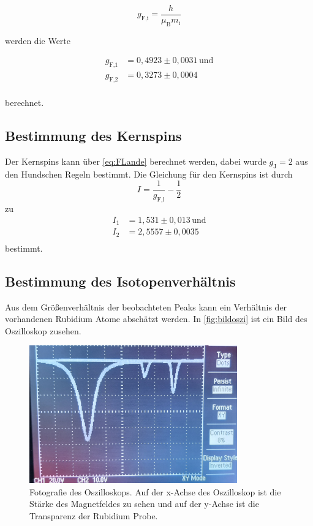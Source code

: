 \begin{equation*}
    g_{\text{F,i}} = \dfrac{h}{\mu_\text{B} m_\text{i}}
\end{equation*}

werden die Werte

\begin{align*}
    g_{\text{F,1}} &= 0,4923 \pm 0,0031 \, \text{und} \\
    g_{\text{F,2}} &= 0,3273 \pm 0,0004           \\
\end{align*}

berechnet.

\subsection{Bestimmung des Kernspins}

Der Kernspins kann über \eqref{eq:FLande} berechnet werden, dabei wurde $g_\text{J} = 2$ aus den Hundschen Regeln bestimmt.
Die Gleichung für den Kernspins ist durch 
\begin{equation*}
    I = \dfrac{1}{g_{\text{F,i}}} - \dfrac{1}{2}
\end{equation*}
zu 
\begin{align*}
    I_1 &= 1,531  \pm 0,013 \, \text{und} \\
    I_2 &= 2,5557 \pm 0,0035           \\
\end{align*}
bestimmt.

\subsection{Bestimmung des Isotopenverhältnis}

Aus dem Größenverhältnis der beobachteten Peaks kann ein Verhältnis der vorhandenen Rubidium Atome abschätzt werden.  
In \autoref{fig:bildoszi} ist ein Bild des Oszilloskop zusehen.

\begin{figure}[H]
    \centering
    \includegraphics[width=0.8\textwidth]{Messdaten/v21_oszi.pdf}
    \caption{Fotografie des Oszilloskops. Auf der x-Achse des Oszilloskop ist die Stärke des Magnetfeldes zu sehen und auf der y-Achse ist die Transparenz der Rubidium Probe.}
    \label{fig:bildoszi}
\end{figure}

